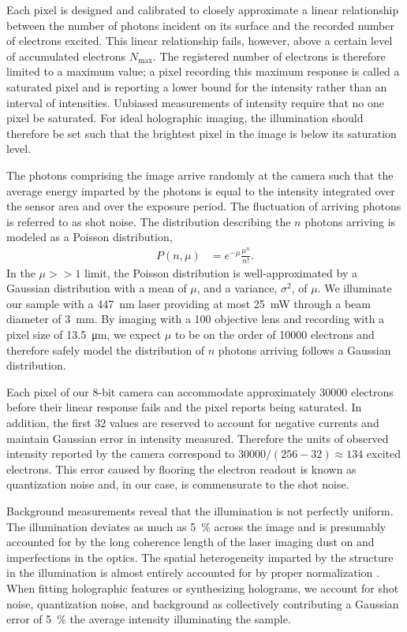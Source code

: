 Each pixel is designed and calibrated to closely approximate a linear relationship
between the number of photons incident on its surface and the recorded number of
electrons excited.
This linear relationship fails, however, above a certain level of accumulated electrons
$N_{\text{max}}$.
The registered number of electrons is therefore limited to a maximum value; a
pixel recording this maximum response is called a saturated pixel and is reporting
a lower bound for the intensity rather than an interval of intensities.
Unbiased measurements of intensity require that no one pixel be saturated.
For ideal holographic imaging, the illumination should therefore be set such that the
brightest pixel in the image is below its saturation level.

The photons comprising the image arrive randomly at the camera
such that the average energy imparted by the photons is equal to the intensity
integrated over the sensor area and over the exposure period. The fluctuation
of arriving photons is referred to as shot noise.
The distribution describing the $n$ photons arriving is modeled as a Poisson distribution,
\begin{align}
  P(n, \mu ) &= e^{-\mu} \frac{\mu^n}{n!}.
  \label{eq:poisson}
\end{align}
In the $\mu >> 1$ limit, the Poisson distribution is well-approximated by a Gaussian distribution
with a mean of $\mu$, and a variance, $\sigma^2$, of $\mu$. We
illuminate our sample with a \SI{447}{\nm} laser providing at most \SI{25}{\milli\watt}
through a beam diameter of \SI{3}{\milli\meter}. By imaging with a \SI{100}{\times} objective
lens and recording with a pixel size of \SI{13.5}{\um}, we expect $\mu$ to be on the
order of \num{10000} electrons and therefore safely model the distribution
of $n$ photons arriving follows a Gaussian distribution.

Each pixel of our $8$-bit camera can accommodate approximately \num{30000} electrons before
their linear response fails and the pixel reports being saturated. In addition, the first
$32$ values are reserved to account for negative currents and maintain Gaussian
error in intensity measured. Therefore the units of observed intensity reported by the
camera correspond to $30000/(256-32) \approx 134$ excited electrons. This error
caused by flooring the electron readout is known as quantization noise and, in our case,
is commensurate to the shot noise.

Background measurements reveal that the illumination is not perfectly uniform. The illumination
deviates as much as \SI{5}{\percent} across the image and is presumably accounted for by the
long coherence length of the laser imaging dust on and imperfections in the optics.
The spatial heterogeneity imparted by the structure in the illumination is almost
entirely accounted for by proper normalization \cite{lee07a}. When fitting holographic
features or synthesizing holograms, we account for shot noise,
quantization noise, and background as collectively contributing a Gaussian error
of \SI{5}{\percent} the average intensity illuminating the sample.



